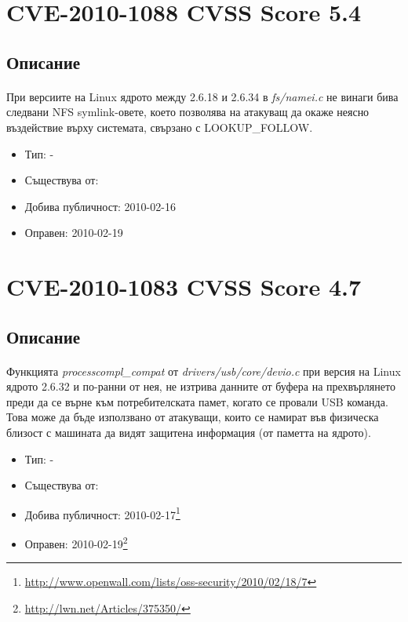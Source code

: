 \documentclass[a4paper,12pt,leqno]{article}
\begin{document}
\section{CVE-2010-1088 CVSS Score 5.4}
\subsection{Описание}
\paragraph{}
При версиите на Linux ядрото между 2.6.18 и 2.6.34 в \textit{fs/namei.c} не винаги бива 
следвани NFS symlink-овете, което позволява на атакуващ да 
окаже неясно въздействие върху системата, свързано с LOOKUP\_FOLLOW.

\begin{itemize}
    \item Тип: -
    \item Съществува от:
  	\item Добива публичност: 2010-02-16
    \item Оправен: 2010-02-19
\end{itemize}

\section{CVE-2010-1083 CVSS Score 4.7}
\subsection{Описание}
\paragraph{}
Функцията \textit{processcompl\_compat} от \textit{drivers/usb/core/devio.c} при версия на Linux 
ядрото 2.6.32 и по-ранни от нея, не изтрива данните от буфера на 
прехвърлянето преди да се върне към потребителската памет, когато се 
провали USB команда. Това може да бъде използвано от атакуващи, които се 
намират във физическа близост с машината да видят защитена информация 
(от паметта на ядрото).


\begin{itemize}
    \item Тип: -
    \item Съществува от:
  	\item Добива публичност: 2010-02-17\footnote{\url{http://www.openwall.com/lists/oss-security/2010/02/18/7}}
    \item Оправен: 2010-02-19\footnote{\url{http://lwn.net/Articles/375350/}}
\end{itemize}
\end{document}
